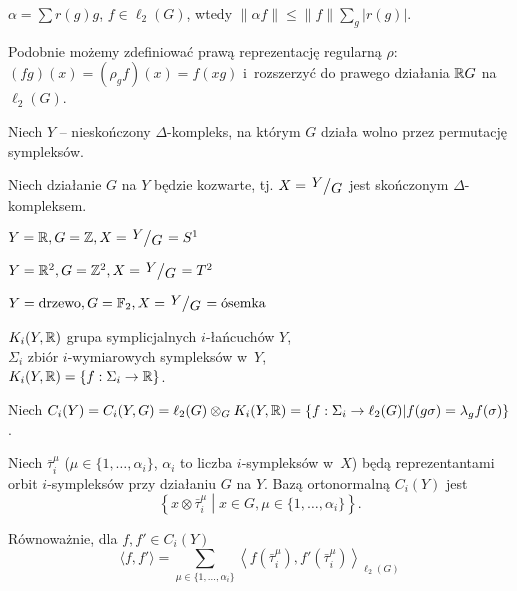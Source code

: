 \begin{uwaga}
	$\alpha = \sum r(g) g$, $f \in \ell_2(G)$, 
	wtedy ${ \| \alpha f\| \leq \| f \| \sum_g |r(g)|}$.
\end{uwaga}

\begin{uwaga}
	Podobnie możemy zdefiniować prawą reprezentację regularną $\rho$:
	${(fg)(x) = (\rho_g f) (x) = f(xg)}$
	i~rozszerzyć do prawego działania ${\mathbb{R}} G$ na $\ell_2(G)$.
\end{uwaga}

Niech $Y$ -- nieskończony $\Delta$-kompleks, na którym $G$ działa wolno
przez permutację sympleksów.

Niech działanie $G$ na $Y$ będzie kozwarte, tj. $X = \bigslant{Y}{G}$
jest skończonym $\Delta$-kompleksem.

\begin{przyklad}
	$Y = \R, G = \Z, X = \bigslant Y G  = S^1$
\end{przyklad}

\begin{przyklad}
	$Y = \R^2, G = \Z^2, X = \bigslant Y G  = T^2$
\end{przyklad}

\begin{przyklad}
	$Y = \text{drzewo}, G = \mb{F}_2, X = \bigslant Y G = \text{ósemka}$
\end{przyklad}

\begin{definicja}[$C_i(Y, G)$]
	$K_i(Y, {\mathbb{R}})$ grupa symplicjalnych $i$-łańcuchów $Y$,
	\\ $\Sigma_i$ zbiór $i$-wymiarowych sympleksów w~$Y$,
	\\ $K_i(Y, {\mathbb{R}}) = \{ f: \Sigma_i \to {\mathbb{R}} \}$.
	
	Niech $C_i(Y) = C_i(Y, G) = {\ell_2(G) \otimes_G K_i(Y, {\mathbb{R}})}
	= { \{f: \Sigma_i \to \ell_2(G) | f(g \sigma) = \lambda_g f(\sigma) \} }$.
\end{definicja}

\begin{definicja}
	Niech $\bar{\tau}_i^\mu$ (${\mu \in \{ 1, \ldots, \alpha_i\}}$,
	$\alpha_i$ to liczba $i$-sympleksów w~$X$) będą
	reprezentantami orbit $i$-sympleksów przy działaniu $G$
	na $Y$. Bazą ortonormalną $C_i(Y)$ jest
	$$\left\{ x \otimes \bar{\tau}_i^\mu 
		\middle| x \in G, \mu \in \{1, \ldots, \alpha_i \} \right\}.$$
		
	Równoważnie, dla $f, f' \in C_i(Y)$
	$$\langle f, f' \rangle =
	\sum_{\mu \in \{1, \ldots, \alpha_i \}}
		\left\langle f(\bar{\tau}_i^\mu), f'(\bar{\tau}_i^\mu) 
				\right\rangle_{\ell_2(G)}$$
\end{definicja}


